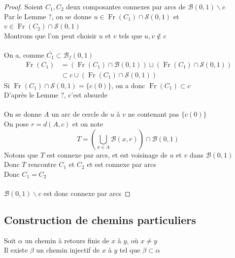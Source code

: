 \documentclass{article}
\begin{document}
\begin{flushleft}
\begin{proof}
    Soient $C_1, C_2$ deux composantes connexes par arcs de $\mathcal{B}(0, 1) \backslash c$\\
    Par le Lemme ?, on se donne $u \in \operatorname{Fr}(C_1) \cap \mathcal{S}(0, 1)$ et
    $v \in \operatorname{Fr}(C_2) \cap \mathcal{S}(0, 1)$\\
    Montrons que l'on peut choisir $u$ et $v$ tels que $u, v \notin c$
    \\~\\
    On a, comme $\overline{C_1} \subset \mathcal{B}_f(0, 1)$
    \begin{align*}
        \operatorname{Fr}(C_1) &= (\operatorname{Fr}(C_1) \cap \mathcal{B}(0, 1))
        \sqcup (\operatorname{Fr}(C_1) \cap \mathcal{S}(0, 1))\\
        &\subset c \cup (\operatorname{Fr}(C_1) \cap \mathcal{S}(0, 1))
    \end{align*}
    Si $\operatorname{Fr}(C_1) \cap \mathcal{S}(0, 1) = \{ c(0) \}$, on a donc $\operatorname{Fr}(C_1) \subset c$\\
    D'après le Lemme ?, c'est absurde
    \\~\\
    On se donne $A$ un arc de cercle de $u$ à $v$ ne contenant pas $\{ c(0) \}$\\
    On pose $r = d(A, c)$ et on note
    \[ T = \left( \bigcup_{x \in A} \mathcal{B}(x, r) \right) \cap \mathcal{B}(0, 1)\]
    Notons que $T$ est connexe par arcs, et est voisinage de $u$ et $v$ dans $\mathcal{B}(0, 1)$\\
    Donc $T$ rencontre $C_1$ et $C_2$ et est connexe par arcs\\
    Donc $C_1 = C_2$
    \\~\\
    $\mathcal{B}(0, 1) \backslash c$ est donc connexe par arcs
\end{proof}

\subsection{Construction de chemins particuliers}

\begin{tcolorbox}[colback = purple!20!white, colframe = purple!60!white, title = Proposition 6]
    Soit $\alpha$ un chemin à retours finis de $x$ à $y$, où $x \neq y$\\
    Il existe $\beta$ un chemin injectif de $x$ à $y$ tel que $\beta \subset \alpha$
\end{tcolorbox}


\end{flushleft}
\end{document}
